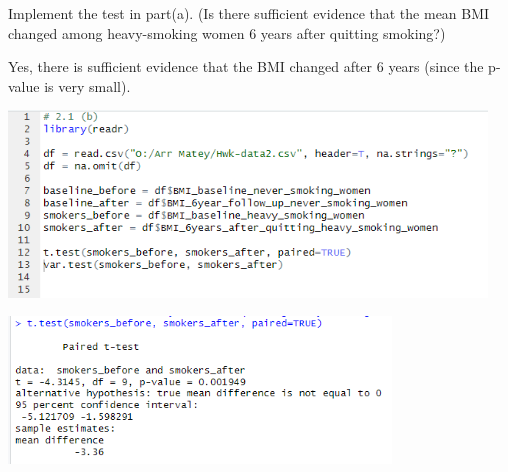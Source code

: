 Implement the test in part(a). (Is there sufficient evidence that the mean BMI changed
among heavy-smoking women 6 years after quitting smoking?)

\soln* Yes, there is sufficient evidence that the BMI changed after 6 years (since the p-value is very small).

\nl \includegraphics*[width=5in]{img/2_1a_code.PNG}

\nl \includegraphics*[width=4in]{img/2_1a_console.PNG}